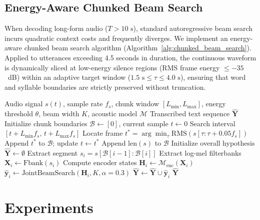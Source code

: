 \documentclass[journal]{IEEEtran}
\begin{document}
\subsection{Energy-Aware Chunked Beam Search}
When decoding long-form audio ($T > 10\text{ s}$), standard autoregressive beam search incurs quadratic context costs and frequently diverges. We implement an energy-aware chunked beam search algorithm (Algorithm~\ref{alg:chunked_beam_search}). Applied to utterances exceeding 4.5 seconds in duration, the continuous waveform is dynamically sliced at low-energy silence regions (RMS frame energy $\le -35$~dB) within an adaptive target window ($1.5\text{ s} \le \tau \le 4.0\text{ s}$), ensuring that word and syllable boundaries are strictly preserved without truncation.

\begin{algorithm}[!t]
\caption{Energy-Aware Chunked Beam Search for Long-Form Audio}
\label{alg:chunked_beam_search}
\begin{algorithmic}[1]
\REQUIRE Audio signal $s(t)$, sample rate $f_s$, chunk window $[L_{\min}, L_{\max}]$, energy threshold $\theta$, beam width $K$, acoustic model $\mathcal{M}$
\ENSURE Transcribed text sequence $\hat{\mathbf{Y}}$
\STATE Initialize chunk boundaries $\mathcal{B} \leftarrow [0]$, current sample $t \leftarrow 0$
    \STATE Search interval $[t + L_{\min} f_s,\, t + L_{\max} f_s]$
    \STATE Locate frame $t^* = \arg\min_{\tau} \text{RMS}(s[\tau : \tau + 0.05 f_s])$
    \STATE Append $t^*$ to $\mathcal{B}$; update $t \leftarrow t^*$
\ENDWHILE
\STATE Append $\text{len}(s)$ to $\mathcal{B}$
\STATE Initialize overall hypothesis $\hat{\mathbf{Y}} \leftarrow \emptyset$
    \STATE Extract segment $s_i = s[\mathcal{B}[i-1] : \mathcal{B}[i]]$
    \STATE Extract log-mel filterbanks $\mathbf{X}_i \leftarrow \text{Fbank}(s_i)$
    \STATE Compute encoder states $\mathbf{H}_i \leftarrow \mathcal{M}_{\text{enc}}(\mathbf{X}_i)$
    \STATE $\hat{\mathbf{y}}_i \leftarrow \text{JointBeamSearch}(\mathbf{H}_i, K, \alpha=0.3)$
    \STATE $\hat{\mathbf{Y}} \leftarrow \hat{\mathbf{Y}} \cup \hat{\mathbf{y}}_i$
\ENDFOR
\RETURN $\hat{\mathbf{Y}}$
\end{algorithmic}
\end{algorithm}

\section{Experiments}
\label{sec:experiments}
\end{document}
